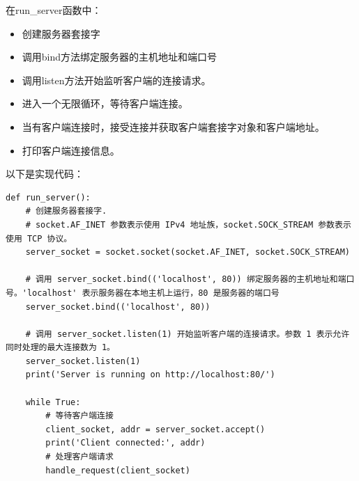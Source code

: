\documentclass[UTF8,12pt]{article}
\begin{document}
在run\_server函数中：
\begin{itemize}
    \item 创建服务器套接字
    \item 调用bind方法绑定服务器的主机地址和端口号
    \item 调用listen方法开始监听客户端的连接请求。
    \item 进入一个无限循环，等待客户端连接。
    \item 当有客户端连接时，接受连接并获取客户端套接字对象和客户端地址。
    \item 打印客户端连接信息。
\end{itemize}

以下是实现代码：

\begin{lstlisting}[title=run\_server函数,frame=shadowbox]
def run_server():
    # 创建服务器套接字.
    # socket.AF_INET 参数表示使用 IPv4 地址族，socket.SOCK_STREAM 参数表示使用 TCP 协议。
    server_socket = socket.socket(socket.AF_INET, socket.SOCK_STREAM)

    # 调用 server_socket.bind(('localhost', 80)) 绑定服务器的主机地址和端口号。'localhost' 表示服务器在本地主机上运行，80 是服务器的端口号
    server_socket.bind(('localhost', 80))

    # 调用 server_socket.listen(1) 开始监听客户端的连接请求。参数 1 表示允许同时处理的最大连接数为 1。
    server_socket.listen(1)
    print('Server is running on http://localhost:80/')

    while True:
        # 等待客户端连接
        client_socket, addr = server_socket.accept()
        print('Client connected:', addr)
        # 处理客户端请求
        handle_request(client_socket)
\end{lstlisting}

\newpage
\end{document}
